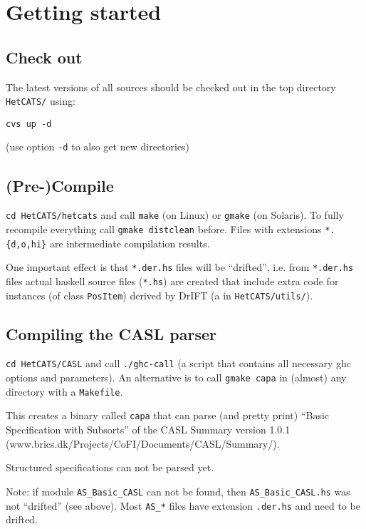 \documentclass{article}
\begin{document}
\section{Getting started}

\subsection{Check out}
The latest versions of all sources should be checked out in the top
directory \texttt{HetCATS/} using:

\texttt{cvs up -d}

(use option \texttt{-d} to also get new directories)

\subsection{(Pre-)Compile}

\texttt{cd HetCATS/hetcats} and call \texttt{make} (on Linux) or
\texttt{gmake} (on Solaris). To fully recompile everything call
\texttt{gmake distclean} before. Files with extensions
\texttt{*.\{d,o,hi\}} are intermediate compilation results.

One important effect is that \texttt{*.der.hs} files will be
``drifted'', i.e.  from \texttt{*.der.hs} files actual haskell source
files (\texttt{*.hs}) are created that include extra code for
instances (of class \texttt{PosItem}) derived by DrIFT (a in
\texttt{HetCATS/utils/}).

\subsection{Compiling the CASL parser}

\texttt{cd HetCATS/CASL} and call \texttt{./ghc-call} (a script that contains
all necessary ghc options and parameters). An alternative is to call
\texttt{gmake capa} in (almost) any directory with a \texttt{Makefile}.

This creates a binary called \texttt{capa} that can parse (and pretty
print) ``Basic Specification with Subsorts'' of the CASL Summary
version 1.0.1 \\ (www.brics.dk/Projects/CoFI/Documents/CASL/Summary/).

Structured specifications can not be parsed yet.

Note: if module \texttt{AS\_Basic\_CASL} can not be found, then
\texttt{AS\_Basic\_CASL.hs} was not ``drifted'' (see above). Most
\texttt{AS\_*} files have extension \texttt{.der.hs} and need to
be drifted.
\end{document}
